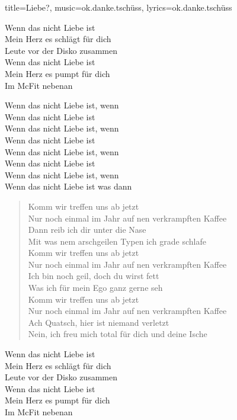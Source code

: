 \begin{song}{title={Liebe?}, music={ok.danke.tschüss}, lyrics={ok.danke.tschüss}}
\begin{chorus}
    Wenn das nicht Liebe ist \\
    Mein Herz es schlägt für dich \\
    Leute vor der Disko zusammen \\
    Wenn das nicht Liebe ist \\
    Mein Herz es pumpt für dich \\
    Im McFit nebenan
\end{chorus}

\begin{bridge}
    Wenn das nicht Liebe ist, wenn \\
    Wenn das nicht Liebe ist \\
    Wenn das nicht Liebe ist, wenn \\
    Wenn das nicht Liebe ist \\
    Wenn das nicht Liebe ist, wenn \\
    Wenn das nicht Liebe ist \\
    Wenn das nicht Liebe ist, wenn \\
    Wenn das nicht Liebe ist was dann
\end{bridge}

\begin{verse}
    Komm wir treffen uns ab jetzt \\
    Nur noch einmal im Jahr auf nen verkrampften Kaffee \\
    Dann reib ich dir unter die Nase \\
    Mit was nem arschgeilen Typen ich grade schlafe \\
    Komm wir treffen uns ab jetzt \\
    Nur noch einmal im Jahr auf nen verkrampften Kaffee \\
    Ich bin noch geil, doch du wirst fett \\
    Was ich für mein Ego ganz gerne seh \\
    Komm wir treffen uns ab jetzt \\
    Nur noch einmal im Jahr auf nen verkrampften Kaffee \\
    Ach Quatsch, hier ist niemand verletzt \\
    Nein, ich freu mich total für dich und deine Ische
\end{verse}

\begin{chorus}
    Wenn das nicht Liebe ist \\
    Mein Herz es schlägt für dich \\
    Leute vor der Disko zusammen \\
    Wenn das nicht Liebe ist \\
    Mein Herz es pumpt für dich \\
    Im McFit nebenan
\end{chorus}


\end{song}
